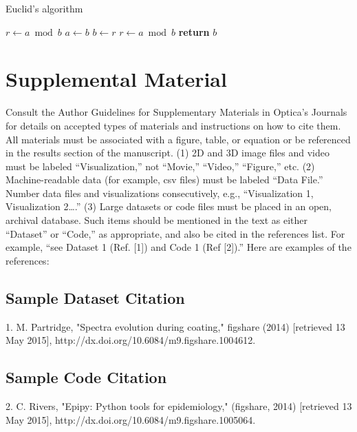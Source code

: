 \documentclass[9pt,twocolumn,twoside]{osajnl}
\begin{document}
\begin{algorithm}
\caption{Euclid’s algorithm}\label{alg:euclid}
\begin{algorithmic}[1]
\State $r\gets a\bmod b$
\State $a\gets b$
\State $b\gets r$
\State $r\gets a\bmod b$
\EndWhile\label{euclidendwhile}
\State \textbf{return} $b$
\EndProcedure
\end{algorithmic}
\end{algorithm}

\section{Supplemental Material}

Consult the Author Guidelines for Supplementary Materials in Optica's Journals for details on accepted types of materials and instructions on how to cite them.
All materials must be associated with a figure, table, or equation or be referenced in the results section of the manuscript.
(1) 2D and 3D image files and video must be labeled “Visualization,” not “Movie,” “Video,” “Figure,” etc.
(2) Machine-readable data (for example, csv files) must be labeled  “Data File.”  Number data files and visualizations consecutively, e.g., “Visualization 1, Visualization 2….”
(3) Large datasets or code files must be placed in an open, archival database.  Such items should be mentioned in the text as either “Dataset” or “Code,” as appropriate, and also be cited in the references list.  For example, “see Dataset 1 (Ref. [1]) and Code 1 (Ref [2]).” Here are examples of the references:

\subsection{Sample Dataset Citation}

1. M. Partridge, "Spectra evolution during coating," figshare (2014) [retrieved 13 May 2015], http://dx.doi.org/10.6084/m9.figshare.1004612.

\subsection{Sample Code Citation}

2. C. Rivers, "Epipy: Python tools for epidemiology," (figshare, 2014) [retrieved 13 May 2015], http://dx.doi.org/10.6084/m9.figshare.1005064.
\end{document}
